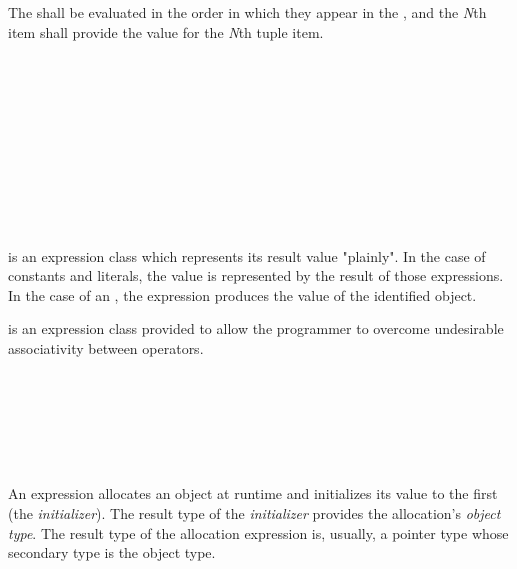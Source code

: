 \specsubsubitem
The  shall be evaluated in the order in which they
appear in the , and the \textit{N}th item shall
provide the value for the \textit{N}th tuple item.


\begin{grammar}
 \\
	 \\
	 \\
	 \\
	 \\
	 \\

 \\
	 \\
	\terminal{(}  \terminal{)} \\
\end{grammar}

\specsubsubitem
{} is an expression class which represents its
result value "plainly". In the case of constants and literals, the value is
represented by the result of those expressions. In the case of an
, the expression produces the value of the identified
object.

\specsubsubitem
{} is an expression class provided to allow the
programmer to overcome undesirable associativity between operators.


\begin{grammar}
 \\
	 \terminal{(}  \terminal{)} \\
	 \terminal{(}   \terminal{)} \\
	 \terminal{(}  \terminal{,}  \terminal{)} \\
	 \terminal{(}  \terminal{)} \\
\end{grammar}

\specsubsubitem
An  expression allocates an object at runtime and initializes
its value to the first  (the \textit{initializer}). The
result type of the \textit{initializer} provides the allocation's
\textit{object type}. The result type of the allocation expression is, usually,
a pointer type whose secondary type is the object type.

